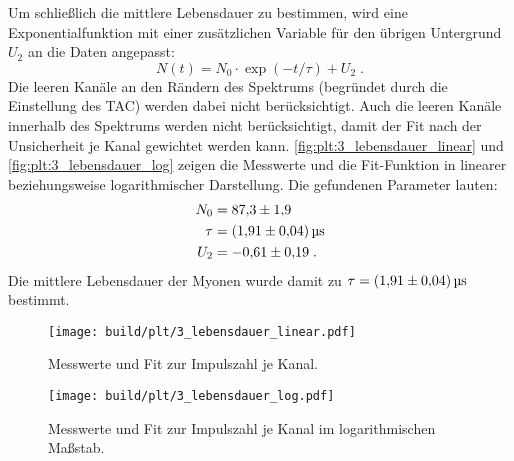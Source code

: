 Um schließlich die mittlere Lebensdauer zu bestimmen,
wird eine Exponentialfunktion mit einer zusätzlichen Variable für den übrigen Untergrund $U_2$ an die Daten angepasst:
\begin{equation*}
    N(t) = N_0 \cdot \exp (-t / \tau) + U_2 \; .
\end{equation*}
Die leeren Kanäle an den Rändern des Spektrums (begründet durch die Einstellung des \ac{TAC}) werden dabei nicht berücksichtigt.
Auch die leeren Kanäle innerhalb des Spektrums werden nicht berücksichtigt,
damit der Fit nach der Unsicherheit je Kanal gewichtet werden kann.
\autoref{fig:plt:3_lebensdauer_linear} und \autoref{fig:plt:3_lebensdauer_log} zeigen die Messwerte und die Fit-Funktion
in linearer beziehungsweise logarithmischer Darstellung.
Die gefundenen Parameter lauten:
\begin{align*}
    N_0 &= \num{87.3 \pm 1.9} \\
    \tau &= \SI{1.91 \pm 0.04}{\micro\second} \\
    U_2 &= \num{-0.61 \pm 0.19} \; .
\end{align*}
Die mittlere Lebensdauer der Myonen wurde damit zu $\tau = \SI{1.91 \pm 0.04}{\micro\second}$ bestimmt.

\begin{figure}
    \centering
    \texttt{[image: build/plt/3\_lebensdauer\_linear.pdf]}
    \caption{Messwerte und Fit zur Impulszahl je Kanal.}
    \label{fig:plt:3_lebensdauer_linear}
\end{figure}

\begin{figure}
    \centering
    \texttt{[image: build/plt/3\_lebensdauer\_log.pdf]}
    \caption{Messwerte und Fit zur Impulszahl je Kanal im logarithmischen Maßstab.}
    \label{fig:plt:3_lebensdauer_log}
\end{figure}

